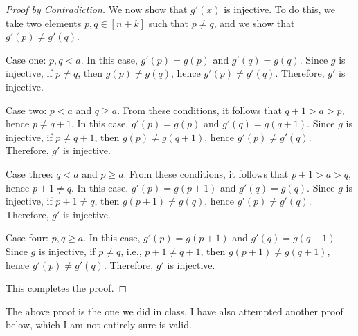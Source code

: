 \documentclass[11pt]{article}
\theoremstyle{definition}
\numberwithin{equation}{subsection}
\begin{document}
\begin{proof}[Proof by Contradiction]
We now show that $g'(x)$ is injective. To do this, we take two elements $p, q \in [n+k]$ such that $p \not = q$, and we show that $g'(p) \not= g'(q)$. 

Case one: $p, q < a$. In this case, $g'(p)=g(p)$ and $g'(q)=g(q)$. Since $g$ is injective, if $p \not= q$, then $g(p) \not= g(q)$, hence $g'(p) \not= g'(q)$. Therefore, $g'$ is injective.

Case two: $p < a$ and $q \geq a$. From these conditions, it follows that $q+1 > a > p$, hence $p \not= q+1$. In this case, $g'(p)=g(p)$ and $g'(q)=g(q+1)$. Since $g$ is injective, if $p \not= q+1$, then $g(p) \not= g(q+1)$, hence $g'(p) \not= g'(q)$. Therefore, $g'$ is injective.

Case three: $q < a$ and $p \geq a$. From these conditions, it follows that $p+1 > a > q$, hence $p+1 \not= q$. In this case, $g'(p)=g(p+1)$ and $g'(q)=g(q)$. Since $g$ is injective, if $p+1 \not= q$, then $g(p+1) \not= g(q)$, hence $g'(p) \not= g'(q)$. Therefore, $g'$ is injective.

Case four: $p, q \geq a$. In this case, $g'(p)=g(p+1)$ and $g'(q)=g(q+1)$. Since $g$ is injective, if $p \not= q$, i.e., $p+1 \not= q+1$, then $g(p+1) \not= g(q+1)$, hence $g'(p) \not= g'(q)$. Therefore, $g'$ is injective.

This completes the proof.

\renewcommand\qedsymbol{QED}
\end{proof}

The above proof is the one we did in class. I have also attempted another proof below, which I am not entirely sure is valid.
\end{document}
